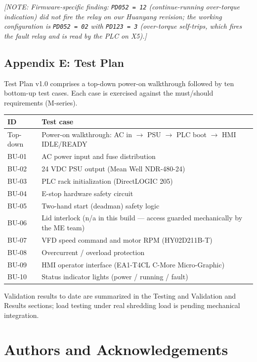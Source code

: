 \documentclass[hidelinks,12pt]{article}
\newcommand{\note}[1]{\textcolor{PSUblue}{\textit{[NOTE: #1]}}}
\begin{document}
\note{Firmware-specific finding: \texttt{PD052 = 12} (continue-running over-torque
indication) did not fire the relay on our Huanyang revision; the working configuration
is \texttt{PD052 = 02} with \texttt{PD123 = 3} (over-torque self-trips, which fires the
fault relay and is read by the PLC on X5).}

\subsection{Appendix E: Test Plan}
Test Plan v1.0 comprises a top-down power-on walkthrough followed by ten bottom-up
test cases. Each case is exercised against the must/should requirements (M-series).

\renewcommand{\arraystretch}{1.2}
\noindent\begin{tabularx}{\textwidth}{|l|X|}
\hline
\textbf{ID} & \textbf{Test case} \\
\hline
Top-down & Power-on walkthrough: AC in $\rightarrow$ PSU $\rightarrow$ PLC boot $\rightarrow$ HMI IDLE/READY \\ \hline
BU-01 & AC power input and fuse distribution \\ \hline
BU-02 & 24 VDC PSU output (Mean Well NDR-480-24) \\ \hline
BU-03 & PLC rack initialization (DirectLOGIC 205) \\ \hline
BU-04 & E-stop hardware safety circuit \\ \hline
BU-05 & Two-hand start (deadman) safety logic \\ \hline
BU-06 & Lid interlock (n/a in this build --- access guarded mechanically by the ME team) \\ \hline
BU-07 & VFD speed command and motor RPM (HY02D211B-T) \\ \hline
BU-08 & Overcurrent / overload protection \\ \hline
BU-09 & HMI operator interface (EA1-T4CL C-More Micro-Graphic) \\ \hline
BU-10 & Status indicator lights (power / running / fault) \\
\hline
\end{tabularx}
\renewcommand{\arraystretch}{1.0}

Validation results to date are summarized in the Testing and Validation and Results
sections; load testing under real shredding load is pending mechanical integration.

\newpage
\section{Authors and Acknowledgements}
\end{document}
